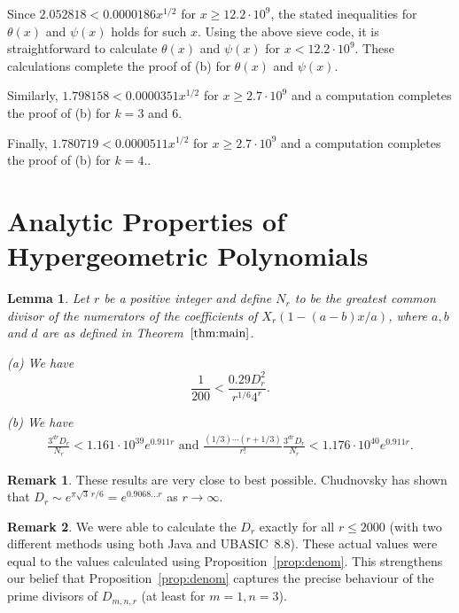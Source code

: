 \documentclass{jT}
\newtheorem{lemma}[theorem]{Lemma}
\theoremstyle{definition}
\newtheorem*{remark}{Remark}
\begin{document}
Since $2.052818 < 0.0000186x^{1/2}$ for $x \geq 12.2 \cdot 10^{9}$, the stated inequalities for
$\theta(x)$ and  $\psi(x)$ holds for such $x$. Using the above sieve code, it is straightforward to calculate
$\theta(x)$ and  $\psi(x)$ for $x < 12.2 \cdot 10^{9}$. These calculations complete the proof
of (b) for $\theta(x)$ and  $\psi(x)$.

Similarly, $1.798158 < 0.0000351x^{1/2}$ for $x \geq 2.7 \cdot 10^{9}$ and a computation completes the proof of (b) for $k=3$ and 6.

Finally, $1.780719 < 0.0000511x^{1/2}$ for $x \geq 2.7 \cdot 10^{9}$ and a computation completes the proof of (b) for $k=4$..

\section{Analytic Properties of Hypergeometric Polynomials}

\begin{lemma}
\label{lem:coeff-ub}
Let $r$ be a positive integer and define $N_{r}$ to be the greatest common
divisor of the numerators of the coefficients of $X_{r}(1-(a-b)x/a)$, where
$a, b$ and $d$ are as defined in Theorem~$\ref{thm:main}$.

\noindent
{\rm (a)} We have
\begin{displaymath}
\frac{1}{200} 
  <   \frac{0.29D_{r}^{2}}{r^{1/6} 4^{r}}.
\end{displaymath}

\noindent
{\rm (b)} We have
\begin{eqnarray*}
\frac{3^{dr} D_{r}}{N_{r}} 
  <   1.161 \cdot 10^{39} e^{0.911r} 
\mbox{ and }
\frac{(1/3) \cdots (r+1/3)}{r!} \frac{3^{dr} D_{r}}{N_{r}} 
< 1.176 \cdot 10^{40} e^{0.911r}.
\end{eqnarray*}
\end{lemma}

\begin{remark}
These results are very close to best possible. 
Chudnovsky \cite{Chud} has shown that  
$D_{r} \sim e^{\pi \sqrt{3}\, r/6}= e^{0.9068\ldots r}$ 
as $r \rightarrow \infty$. 
\end{remark}

\begin{remark}
We were able to calculate the $D_{r}$ exactly for all $r \leq 2000$
(with two different methods using both Java and UBASIC~8.8). These actual values were
equal to the values calculated using Proposition~\ref{prop:denom}. This strengthens
our belief that Proposition~\ref{prop:denom} captures the precise behaviour of the
prime divisors of $D_{m,n,r}$ (at least for $m=1, n=3$).
\end{remark}
\end{document}

